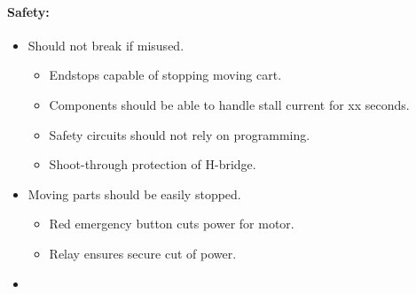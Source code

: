 \paragraph{Safety:}
\begin{itemize}
	\item Should not break if misused.
	\begin{itemize}
		\item Endstops capable of stopping moving cart.
		\item Components should be able to handle stall current for xx seconds.
		\item Safety circuits should not rely on programming.
		\item Shoot-through protection of H-bridge.
	\end{itemize}

	\item Moving parts should be easily stopped.
		\begin{itemize}
			\item Red emergency button cuts power for motor.
			\item Relay ensures secure cut of power.
		\end{itemize}

	\item 
\end{itemize}
